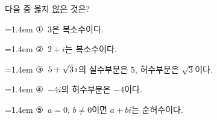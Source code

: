 다음 중 옳지 \underline{않은} 것은?
\par\medskip\par\noindent\hangindent=1.4em {\small ①}\ $3$은 복소수이다.\par\noindent\hangindent=1.4em {\small ②}\ $2+i$는 복소수이다.\par\noindent\hangindent=1.4em {\small ③}\ $5+\sqrt{3}\mkern3mu i$의 실수부분은 $5$, 허수부분은 $\sqrt{3}$이다.\par\noindent\hangindent=1.4em {\small ④}\ $-4i$의 허수부분은 $-4$이다.\par\noindent\hangindent=1.4em {\small ⑤}\ $a=0$, $b\ne 0$이면 $a+bi$는 순허수이다.\par\medskip
